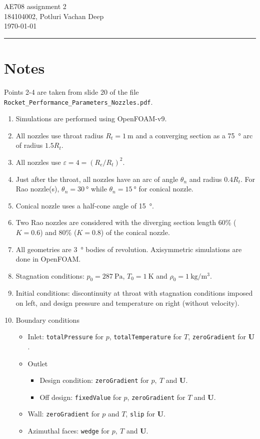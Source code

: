 \documentclass{article}
\newcommand{\vect}[1]{\ensuremath{\boldsymbol{\mathbf{#1}}}}
\begin{document}
\begin{center}
    {\Large AE708 assignment 2}\\[0.5em]
    {\large 184104002, Potluri Vachan Deep}\\[0.5em]
    {\today}
    \rule{\linewidth}{2pt}
\end{center}

\section*{Notes}
Points 2-4 are taken from slide 20 of the file \texttt{Rocket\_Performance\_Parameters\_Nozzles.pdf}.
\begin{enumerate}
    \item Simulations are performed using OpenFOAM-v9.
    \item All nozzles use throat radius $R_t = \SI{1}{\meter}$ and a converging section as a \SI{75}{\degree} arc of radius $1.5 R_t$.
    \item All nozzles use $\varepsilon = 4 = (R_e/R_t)^2$.
    \item Just after the throat, all nozzles have an arc of angle $\theta_n$ and radius $0.4 R_t$. For Rao nozzle(s), $\theta_n = \SI{30}{\degree}$ while $\theta_n = \SI{15}{\degree}$ for conical nozzle.
    \item Conical nozzle uses a half-cone angle of \SI{15}{\degree}.
    \item Two Rao nozzles are considered with the diverging section length 60\% ($K=0.6$) and 80\% ($K=0.8$) of the conical nozzle.
    \item All geometries are \SI{3}{\degree} bodies of revolution. Axisymmetric simulations are done in OpenFOAM.
    \item Stagnation conditions: $p_0 = \SI{287}{\pascal}$, $T_0 = \SI{1}{\kelvin}$ and $\rho_0 = \SI{1}{\kg\per\meter\cubed}$.
    \item Initial conditions: discontinuity at throat with stagnation conditions imposed on left, and design pressure and temperature on right (without velocity).
    \item Boundary conditions
    \begin{itemize}
        \item Inlet: \texttt{totalPressure} for $p$, \texttt{totalTemperature} for $T$, \texttt{zeroGradient} for $\vect{U}$.
        \item Outlet
        \begin{itemize}
            \item Design condition: \texttt{zeroGradient} for $p,\ T$ and $\vect{U}$.
            \item Off design: \texttt{fixedValue} for $p$, \texttt{zeroGradient} for $T$ and $\vect{U}$.
        \end{itemize}
        \item Wall: \texttt{zeroGradient} for $p$ and $T$, \texttt{slip} for $\vect{U}$.
        \item Azimuthal faces: \texttt{wedge} for $p,\ T$ and $\vect{U}$.
    \end{itemize}
\end{enumerate}
\end{document}
